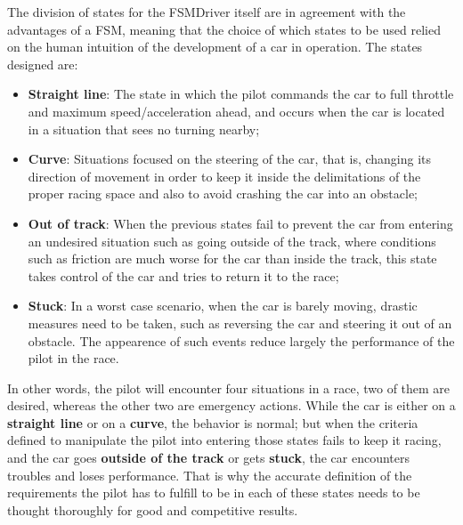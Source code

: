 The division of states for the FSMDriver itself are in agreement with the advantages of a FSM, meaning that the choice of
which states to be used relied on the human intuition of the development of a car in operation. The states designed are:


\begin{itemize}
	\item \textbf{Straight line}: The state in which the pilot commands the car to full throttle and maximum 
	speed/acceleration ahead, and occurs when the car is located in a situation that sees no turning nearby;
	
	\item \textbf{Curve}: Situations focused on the steering of the car, that is, changing its direction of movement
	in order to keep it inside the delimitations of the proper racing space and also to avoid crashing the car into
	an obstacle;
	
	\item \textbf{Out of track}: When the previous states fail to prevent the car from entering an undesired situation
	such as going outside of the track, where conditions such as friction are much worse for the car than inside the
	track, this state takes control of the car and tries to return it to the race;
	
	\item \textbf{Stuck}: In a worst case scenario, when the car is barely moving, drastic measures need to be taken,
	such as reversing the car and steering it out of an obstacle. The appearence of such events reduce largely the
	performance of the pilot in the race.
\end{itemize}

In other words, the pilot will encounter four situations in a race, two of them are desired, whereas the other two are 
emergency actions. While the car is either on a \textbf{straight line} or on a \textbf{curve}, the behavior is normal; 
but when the criteria defined to manipulate the pilot into entering those states fails to keep it racing, and the car 
goes \textbf{outside of the track} or gets \textbf{stuck}, the car encounters troubles and loses performance. That is why
the accurate definition of the requirements the pilot has to fulfill to be in each of these states needs to be thought 
thoroughly for good and competitive results.
